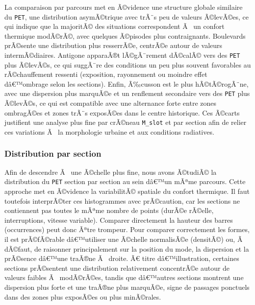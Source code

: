 \documentclass{article}
\begin{document}
La comparaison par parcours met en Ã©vidence une structure globale similaire du \texttt{PET}, une distribution asymÃ©trique avec trÃ¨s peu de valeurs Ã©levÃ©es, ce qui indique que la majoritÃ© des situations correspondent Ã  un confort thermique modÃ©rÃ©, avec quelques Ã©pisodes plus contraignants. Boulevards prÃ©sente une distribution plus resserrÃ©e, centrÃ©e autour de valeurs intermÃ©diaires. Antigone apparaÃ®t lÃ©gÃ¨rement dÃ©calÃ© vers des \texttt{PET} plus Ã©levÃ©s, ce qui suggÃ¨re des conditions un peu plus souvent favorables au rÃ©chauffement ressenti (exposition, rayonnement ou moindre effet dâ€™ombrage selon les sections). Enfin, Ã‰cusson est le plus hÃ©tÃ©rogÃ¨ne, avec une dispersion plus marquÃ©e et un renflement secondaire vers des \texttt{PET} plus Ã©levÃ©s, ce qui est compatible avec une alternance forte entre zones ombragÃ©es et zones trÃ¨s exposÃ©es dans le centre historique. Ces Ã©carts justifient une analyse plus fine par crÃ©neau \texttt{M\_slot} et par section afin de relier ces variations Ã  la morphologie urbaine et aux conditions radiatives.

\subsubsection{Distribution par section}
\label{sec:dist_pet_sections}

Afin de descendre Ã  une Ã©chelle plus fine, nous avons Ã©tudiÃ© la distribution du \texttt{PET} section par section au sein dâ€™un mÃªme parcours. Cette approche met en Ã©vidence la variabilitÃ© spatiale du confort thermique. Il faut toutefois interprÃ©ter ces histogrammes avec prÃ©caution, car les sections ne contiennent pas toutes le mÃªme nombre de points (durÃ©e rÃ©elle, interruptions, vitesse variable). Comparer directement la hauteur des barres (occurrences) peut donc Ãªtre trompeur. Pour comparer correctement les formes, il est prÃ©fÃ©rable dâ€™utiliser une Ã©chelle normalisÃ©e (densitÃ©) ou, Ã  dÃ©faut, de raisonner principalement sur la position du mode, la dispersion et la prÃ©sence dâ€™une traÃ®ne Ã  droite. Ã€ titre dâ€™illustration, certaines sections prÃ©sentent une distribution relativement concentrÃ©e autour de valeurs faibles Ã  modÃ©rÃ©es, tandis que dâ€™autres sections montrent une dispersion plus forte et une traÃ®ne plus marquÃ©e, signe de passages ponctuels dans des zones plus exposÃ©es ou plus minÃ©rales.
\end{document}
